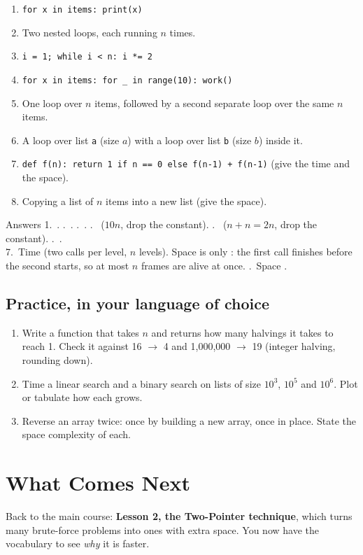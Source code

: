 \documentclass[11pt,a4paper]{article}
\newcommand{\Oone}{\On{1}}
\newcommand{\Olog}{\On{log n}}
\newcommand{\Olin}{\On{n}}
\newcommand{\Osq}{\On{n\textsuperscript{2}}}
\newcommand{\Oexp}{\On{2\textsuperscript{n}}}
\begin{document}
\begin{enumerate}[leftmargin=1.8em,itemsep=4pt]
  \item \texttt{for x in items: print(x)}
  \item Two nested loops, each running $n$ times.
  \item \texttt{i = 1; while i < n: i *= 2}
  \item \texttt{for x in items: for \_ in range(10): work()}
  \item One loop over $n$ items, followed by a second separate loop over the same $n$ items.
  \item A loop over list \texttt{a} (size $a$) with a loop over list \texttt{b} (size $b$) inside it.
  \item \texttt{def f(n): return 1 if n == 0 else f(n-1) + f(n-1)} (give the time and the space).
  \item Copying a list of $n$ items into a new list (give the space).
\end{enumerate}

\begin{callout}[green]{Answers}
\small
1.~\Olin. .~\Osq. .~\Olog. .~\Olin{} ($10n$, drop the constant). .~\Olin{} ($n+n=2n$, drop the constant). .~.\\
7.~Time \Oexp{} (two calls per level, $n$ levels). Space is only \Olin{}: the first call finishes before the second starts, so at most $n$ frames are alive at once. .~Space \Olin.
\end{callout}

\subsection{Practice, in your language of choice}
\begin{enumerate}[leftmargin=1.8em,itemsep=4pt]
  \item Write a function that takes $n$ and returns how many halvings it takes to reach 1. Check it against 16 $\to$ 4 and 1,000,000 $\to$ 19 (integer halving, rounding down).
  \item Time a linear search and a binary search on lists of size $10^3$, $10^5$ and $10^6$. Plot or tabulate how each grows.
  \item Reverse an array twice: once by building a new array, once in place. State the space complexity of each.
\end{enumerate}

\section*{What Comes Next}
Back to the main course: \textbf{Lesson 2, the Two-Pointer technique}, which turns many \Osq{} brute-force problems into \Olin{} ones with \Oone{} extra space. You now have the vocabulary to see \emph{why} it is faster.
\end{document}
